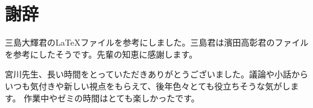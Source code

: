 \documentclass[main.tex]{subfiles}
\begin{document}
\section*{謝辞}
三島大輝君のLaTeXファイルを参考にしました。三島君は濱田高彰君のファイルを参考にしたそうです。先輩の知恵に感謝します。

宮川先生、長い時間をとっていただきありがとうございました。議論や小話からいつも気付きや新しい視点をもらえて、後年色々とても役立ちそうな気がします。
作業中やゼミの時間はとても楽しかったです。\\

\end{document}
